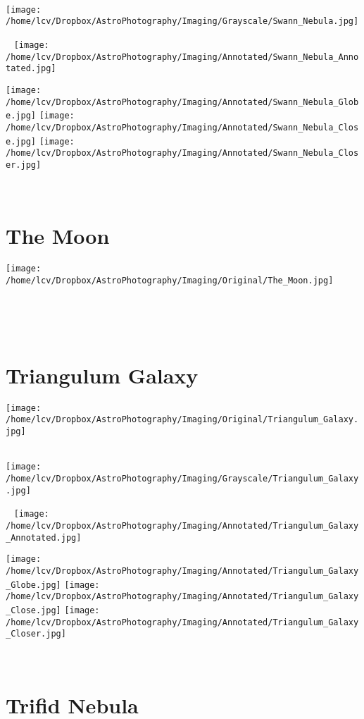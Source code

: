 {\footnotesize\color{white}


}\ \\
\texttt{[image: /home/lcv/Dropbox/AstroPhotography/Imaging/Grayscale/Swann\_Nebula.jpg]}
\begin{center}
 \ \newpage
\texttt{[image: /home/lcv/Dropbox/AstroPhotography/Imaging/Annotated/Swann\_Nebula\_Annotated.jpg]}

\texttt{[image: /home/lcv/Dropbox/AstroPhotography/Imaging/Annotated/Swann\_Nebula\_Globe.jpg]}
\texttt{[image: /home/lcv/Dropbox/AstroPhotography/Imaging/Annotated/Swann\_Nebula\_Close.jpg]}
\texttt{[image: /home/lcv/Dropbox/AstroPhotography/Imaging/Annotated/Swann\_Nebula\_Closer.jpg]}
\end{center}
\ \\\section{The Moon}
\texttt{[image: /home/lcv/Dropbox/AstroPhotography/Imaging/Original/The\_Moon.jpg]}
{\footnotesize\color{white}


}\ \\
\begin{center}
\end{center}
\ \\\section{Triangulum Galaxy}
\texttt{[image: /home/lcv/Dropbox/AstroPhotography/Imaging/Original/Triangulum\_Galaxy.jpg]}
{\footnotesize\color{white}


}\ \\
\texttt{[image: /home/lcv/Dropbox/AstroPhotography/Imaging/Grayscale/Triangulum\_Galaxy.jpg]}
\begin{center}
 \ \newpage
\texttt{[image: /home/lcv/Dropbox/AstroPhotography/Imaging/Annotated/Triangulum\_Galaxy\_Annotated.jpg]}

\texttt{[image: /home/lcv/Dropbox/AstroPhotography/Imaging/Annotated/Triangulum\_Galaxy\_Globe.jpg]}
\texttt{[image: /home/lcv/Dropbox/AstroPhotography/Imaging/Annotated/Triangulum\_Galaxy\_Close.jpg]}
\texttt{[image: /home/lcv/Dropbox/AstroPhotography/Imaging/Annotated/Triangulum\_Galaxy\_Closer.jpg]}
\end{center}
\ \\\section{Trifid Nebula}
